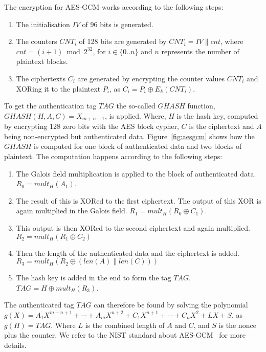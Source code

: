 The encryption for AES-GCM works according to the following steps:

\begin{enumerate}
  \item The initialisation $IV$ of 96 bits is generated.
  \item The counters $CNT_i$ of 128 bits are generated by $CNT_i = IV \parallel
cnt$, where $cnt = (i + 1) \bmod{2^{32}}$, for $i \in\{0 .. n\}$ and $n$
represents the number of plaintext blocks.
  \item The ciphertexts $C_i$ are generated by encrypting the counter values
$CNT_i$ and XORing it to the plaintext $P_i$, as $C_i = P_i \oplus E_k(CNT_i)$.
\end{enumerate}

To get the authentication tag $TAG$ the so-called $GHASH$ function,
$GHASH(H, A, C) = X_{m+n+1}$, is applied. Where, $H$ is the hash key, computed
by encrypting 128 zero bits with the AES block cypher, $C$ is the ciphertext
and $A$ being non-encrypted but authenticated data. Figure~\ref{fig:aesgcm}
shows how the $GHASH$ is computed for one block of authenticated data and two
blocks of plaintext. The computation happens according to the following steps:

\begin{enumerate}
  \item The Galois field multiplication is applied to the block of
authenticated data. $R_0 = mult_H(A_1)$.
  \item The result of this is XORed to the first ciphertext. The output
of this XOR is again multiplied in the Galois field. $R_1 = mult_H(R_0 \oplus
C_1)$.
  \item This output is then XORed to the second ciphertext and again
multiplied. $R_2 = mult_H(R_1 \oplus C_2)$
  \item Then the length of the authenticated data and the ciphertext is
added. $R_3 = mult_H(R_2 \oplus (len(A) \parallel len(C)))$
  \item The hash key is added in the end to form the tag $TAG$. $TAG = H \oplus
mult_H(R_3)$.
\end{enumerate}

The authenticated tag $TAG$ can therefore be found by solving the polynomial
$g(X) = A_{1}X^{m+n+1} + \cdots + A_{m}X^{n+2} + C_{1}X^{n+1} + \cdots +
C_{n}X^2 + LX + S$, as $g(H) = TAG$. Where $L$ is the combined length of $A$
and $C$, and $S$ is the nonce plus the counter. We refer to the NIST
standard about AES-GCM~\cite{gcmnist} for more details.

